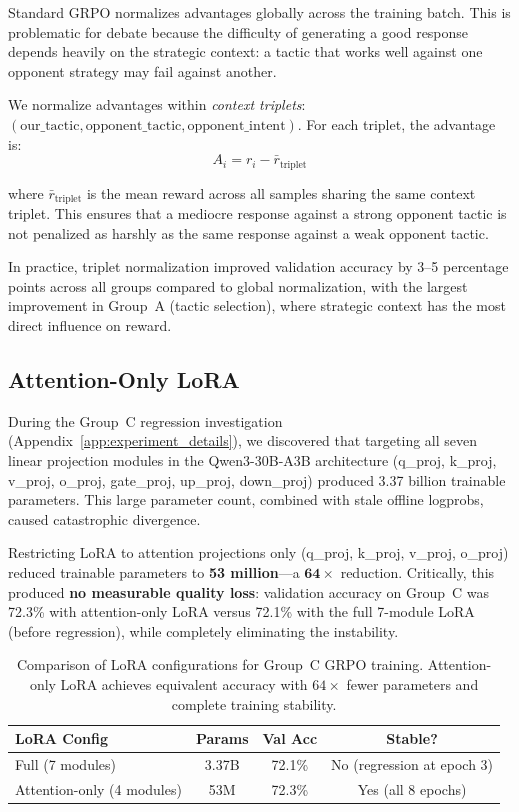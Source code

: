 Standard GRPO normalizes advantages globally across the training batch.
This is problematic for debate because the difficulty of generating a
good response depends heavily on the strategic context: a tactic that
works well against one opponent strategy may fail against another.

We normalize advantages within \emph{context triplets}:
$(\text{our\_tactic}, \text{opponent\_tactic}, \text{opponent\_intent})$.
For each triplet, the advantage is:
\begin{equation}
A_i = r_i - \bar{r}_{\text{triplet}}
\end{equation}

\noindent where $\bar{r}_{\text{triplet}}$ is the mean reward across all
samples sharing the same context triplet. This ensures that a mediocre
response against a strong opponent tactic is not penalized as harshly as
the same response against a weak opponent tactic.

In practice, triplet normalization improved validation accuracy by 3--5
percentage points across all groups compared to global normalization,
with the largest improvement in Group~A (tactic selection), where
strategic context has the most direct influence on reward.

\subsection{Attention-Only LoRA}

During the Group~C regression investigation
(Appendix~\ref{app:experiment_details}), we discovered that
targeting all seven linear projection modules in the Qwen3-30B-A3B
architecture (q\_proj, k\_proj, v\_proj, o\_proj, gate\_proj, up\_proj,
down\_proj) produced 3.37 billion trainable parameters. This large
parameter count, combined with stale offline logprobs, caused
catastrophic divergence.

Restricting LoRA to attention projections only (q\_proj, k\_proj,
v\_proj, o\_proj) reduced trainable parameters to \textbf{53 million}---a
$\mathbf{64\times}$ reduction. Critically, this produced \textbf{no measurable
quality loss}: validation accuracy on Group~C was 72.3\% with
attention-only LoRA versus 72.1\% with the full 7-module LoRA (before
regression), while completely eliminating the instability.

\begin{table}[h]
\centering
\small
\begin{tabular}{lccc}
\toprule
\textbf{LoRA Config} & \textbf{Params} & \textbf{Val Acc} & \textbf{Stable?} \\
\midrule
Full (7 modules) & 3.37B & 72.1\% & No (regression at epoch 3) \\
Attention-only (4 modules) & 53M & 72.3\% & Yes (all 8 epochs) \\
\bottomrule
\end{tabular}
\caption{Comparison of LoRA configurations for Group~C GRPO training.
Attention-only LoRA achieves equivalent accuracy with $64\times$ fewer
parameters and complete training stability.}
\label{tab:lora_comparison}
\end{table}


